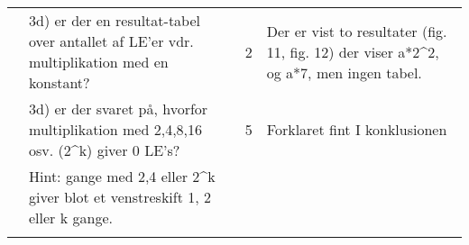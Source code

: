 \begin{table}[h]
\begin{tabularx}{\textwidth}{p{3.5cm}Xp{5mm}X}
                                              & 3d) er der en resultat-tabel over antallet af LE’er vdr. multiplikation med en konstant?            & 2 & Der er vist to resultater (fig. 11, fig. 12) der viser a*2\textasciicircum{}2, og a*7, men ingen tabel. \\
                                              & 3d) er der svaret på, hvorfor multiplikation med 2,4,8,16 osv. (2\textasciicircum{}k) giver 0 LE’s? & 5 & Forklaret fint I konklusionen                                                                           \\
                                              & Hint: gange med 2,4 eller 2\textasciicircum{}k giver blot et venstreskift 1, 2 eller k gange.       &   &                                                                                                         \\
                                              &                                                                                                     &   &                                                                                                         \\\midrule
    \end{tabularx}
\end{table}

